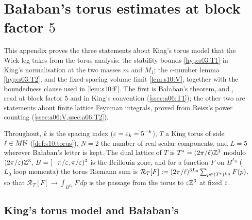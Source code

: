 \providecommand{\BALint}{\ensuremath{(\mathrm{BAL}_{5})[\mathrm{int}]}}
\providecommand{\RENorb}{\ensuremath{(\mathrm{REN}_{\mathrm{orb}})}}
\providecommand{\Efin}{\ensuremath{E_{\mathrm{fin}}}}
\providecommand{\RT}[1]{\ensuremath{\mathcal R_{T}[#1]}}
\providecommand{\BZ}{\ensuremath{B}}
\providecommand{\sxivCT}{\ensuremath{(\mathrm{CT}_{\infty})}}

\section{Ba{\l}aban's torus estimates at block factor $5$}\label{app:a06_BALtorus}

This appendix proves the three statements about King's torus model that the Wick leg takes from the torus analysis: the stability bounds \cref{hyp:s03:T1} in King's normalisation at the two masses $m$ and $M_1$; the $c$-number lemma \cref{hyp:s03:T2}; and the fixed-spacing volume limit \cref{lem:s10:V}, together with the boundedness clause used in \cref{lem:s10:F}. The first is Ba{\l}aban's theorem, \cite[(1.14)]{Ba1} and \cite[(1.3)]{Ba2}, read at block factor $5$ and in King's convention (\cref{ssec:a06:T1}); the other two are statements about finite lattice Feynman integrals, proved from Reisz's power counting (\cref{ssec:a06:V,ssec:a06:T2}).

Throughout, $k$ is the spacing index ($\varepsilon=\varepsilon_k=5^{-k}$), $T$ a King torus of side $\ell\in M\mathbb N$ (\cref{def:s10:torus}), $N=2$ the number of real scalar components, and $L=5$ wherever Ba{\l}aban's letter is kept. The dual lattice of $T$ is $T^*=(2\pi/\ell)\mathbb Z^3$ modulo $(2\pi/\varepsilon)\mathbb Z^3$, $\BZ=[-\pi/\eps,\pi/\eps)^3$ is the Brillouin zone, and for a function $F$ on $\BZ^{L_0}$ ($L_0$ loop momenta) the torus Riemann sum is $\RT{F}\defeq(2\pi/\ell)^{3L_0}\sum_{p\in(T^*)^{L_0}}F(p)$, so that $\RT F\to\int_{\BZ^{L_0}}F\,dp$ is the passage from the torus to $\varepsilon\mathbb Z^3$ at fixed $\varepsilon$.

\subsection{King's torus model and Ba{\l}aban's}\label{ssec:a06:setting}

